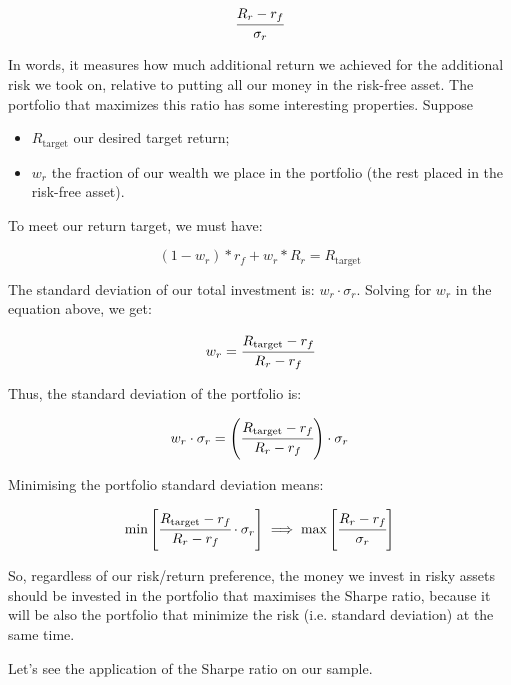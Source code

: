 \begin{equation} \cfrac{R_r - r_f}{\sigma_r} \end{equation}

In words, it measures how much additional return we achieved for the
additional risk we took on, relative to putting all our money in the
risk-free asset. The portfolio that maximizes this ratio has some interesting properties. Suppose

\begin{itemize}
\tightlist
\item
  \(R_\textrm{target}\) our desired target return;
\item
  \(w_r\) the fraction of our wealth we place in the portfolio (the
  rest placed in the risk-free asset).
\end{itemize}

To meet our return target, we must have:

\begin{equation} (1 - w_r) * r_f + w_r * R_r =R_\textrm{target} \end{equation}

The standard deviation of our total investment is:
\(w_r\cdot \sigma_r\). Solving for \(w_r\) in the equation above, we
get:

\begin{equation} w_r = \cfrac{R_\textrm{target} - r_f}{R_r - r_f} \end{equation}

Thus, the standard deviation of the portfolio is:

\begin{equation} w_r\cdot \sigma_r = \left(\cfrac{R_\textrm{target} - r_f}{R_r - r_f}\right)\cdot \sigma_r \end{equation}

Minimising the portfolio standard deviation means:

\begin{equation} \textrm{min}\left[\cfrac{R_\textrm{target} - r_f}{R_r - r_f}\cdot \sigma_r\right]\implies\textrm{max}\left[\cfrac{R_r - r_f}{\sigma_r}\right] \end{equation}

So, regardless of our risk/return preference, the money we invest in
risky assets should be invested in the portfolio that maximises
the Sharpe ratio, because it will be also the portfolio that minimize 
the risk (i.e. standard deviation) at the same time.

Let's see the application of the Sharpe ratio on our sample.

